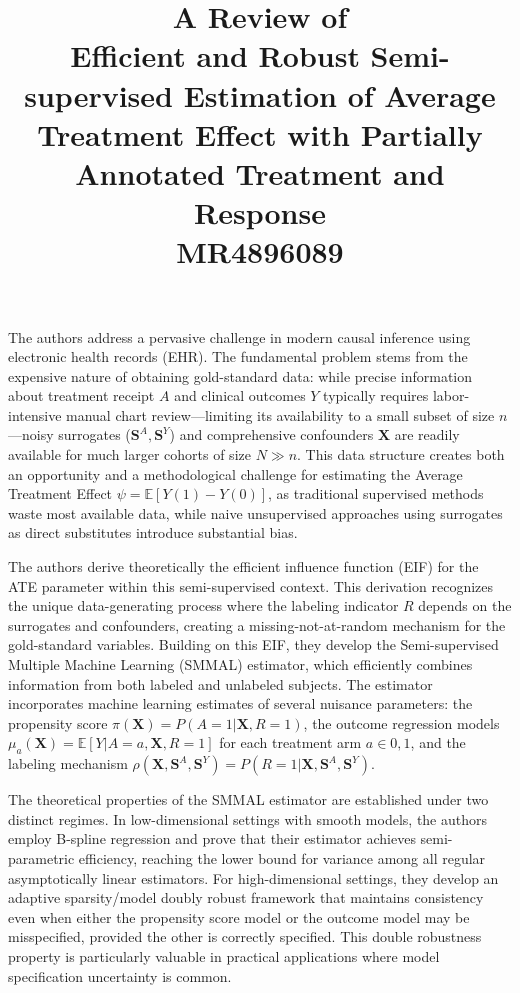 \documentclass[11pt]{article}
\title{A Review of \\Efficient and Robust Semi-supervised Estimation of Average
	Treatment Effect with Partially Annotated Treatment and	Response \\ MR4896089}
\begin{document}
	\maketitle	
	
The authors address a pervasive challenge in modern causal inference using electronic health records (EHR). The fundamental problem stems from the expensive nature of obtaining gold-standard data: while precise information about treatment receipt $A$ and clinical outcomes $Y$ typically requires labor-intensive manual chart review—limiting its availability to a small subset of size $n$—noisy surrogates ($\mathbf{S}^A, \mathbf{S}^Y$) and comprehensive confounders $\mathbf{X}$ are readily available for much larger cohorts of size $N \gg n$. This data structure creates both an opportunity and a methodological challenge for estimating the Average Treatment Effect $\psi = \mathbb{E}[Y(1) - Y(0)]$, as traditional supervised methods waste most available data, while naive unsupervised approaches using surrogates as direct substitutes introduce substantial bias.

The authors derive theoretically the efficient influence function (EIF) for the ATE parameter within this semi-supervised context. This derivation recognizes the unique data-generating process where the labeling indicator $R$ depends on the surrogates and confounders, creating a missing-not-at-random mechanism for the gold-standard variables. Building on this EIF, they develop the Semi-supervised Multiple Machine Learning (SMMAL) estimator, which efficiently combines information from both labeled and unlabeled subjects. The estimator incorporates machine learning estimates of several nuisance parameters: the propensity score $\pi(\mathbf{X}) = P(A=1 | \mathbf{X}, R=1)$, the outcome regression models $\mu_a(\mathbf{X}) = \mathbb{E}[Y | A=a, \mathbf{X}, R=1]$ for each treatment arm $a \in {0,1}$, and the labeling mechanism $\rho(\mathbf{X}, \mathbf{S}^A, \mathbf{S}^Y) = P(R=1 | \mathbf{X}, \mathbf{S}^A, \mathbf{S}^Y)$.

The theoretical properties of the SMMAL estimator are established under two distinct regimes. In low-dimensional settings with smooth models, the authors employ B-spline regression and prove that their estimator achieves semi-parametric efficiency, reaching the lower bound for variance among all regular asymptotically linear estimators. For high-dimensional settings, they develop an adaptive sparsity/model doubly robust framework that maintains consistency even when either the propensity score model or the outcome model may be misspecified, provided the other is correctly specified. This double robustness property is particularly valuable in practical applications where model specification uncertainty is common.
\end{document}

